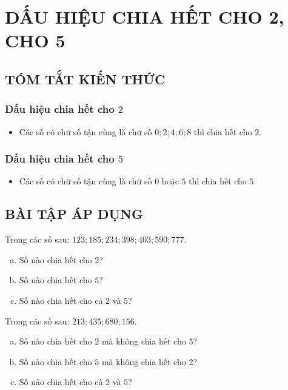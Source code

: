 \section{DẤU HIỆU CHIA HẾT CHO 2, CHO 5}
\subsection{TÓM TẮT KIẾN THỨC}
\begin{tomtat}
	\subsubsection{Dấu hiệu chia hết cho $2$}
\begin{itemize}
\item Các số có chữ số tận cùng là chữ số $0; 2; 4; 6; 8$ thì chia hết cho $2$.
\end{itemize}
	\subsubsection{Dấu hiệu chia hết cho $5$}
\begin{itemize}
\item Các số có chữ số tận cùng là chữ số $0$ hoặc $5$ thì chia hết cho $5$.
\end{itemize}
\end{tomtat}
\subsection{BÀI TẬP ÁP DỤNG}
\begin{bt} Trong các số sau: $123; 185; 234; 398; 403; 590; 777$.
\begin{enumerate}[a)]
\item Số nào chia hết cho $2$?
\item Số nào chia hết cho $5$?
\item Số nào chia hết cho cả $2$ và $5$?
\end{enumerate}
\end{bt}   \begin{bt} Trong các số sau: $213; 435; 680; 156$.
\begin{enumerate}[a)]
\item Số nào chia hết cho $2$ mà không chia hết cho $5$?
\item Số nào chia hết cho $5$ mà không chia hết cho $2$?
\item Số nào chia hết cho cả $2$ và $5$?
\end{enumerate}
\end{bt}
